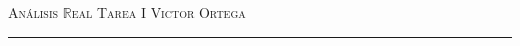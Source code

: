 \documentclass[12pt]{article}
\newcommand\R{\ensuremath{\mathbb{R}}}
\begin{document}
\thispagestyle{empty}

{\scshape Análisis $\R$eal} \hfill {\scshape \large Tarea I} \hfill {\scshape Victor Ortega}
 
\smallskip

\hrule

\bigskip

\bigskip

\theoremstyle{definition}
\newtheorem*{definition}{Definición}

\theoremstyle{definition}
\newtheorem*{dem}{Demostración}

\theoremstyle{definition}
\newtheorem*{notation}{Notación}

\theoremstyle{definition}
\newtheorem*{theorem}{Teorema}

\theoremstyle{definition}
\newtheorem*{lema}{Lema}

\theoremstyle{remark}
\newtheorem*{observation}{Observación}

\theoremstyle{remark}
\newtheorem*{example}{Ejemplo}
\end{document}
